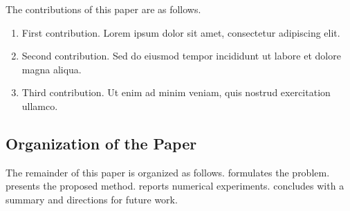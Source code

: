 The contributions of this paper are as follows.
\begin{enumerate}[label=(\arabic*)]
    \item First contribution. Lorem ipsum dolor sit amet, consectetur adipiscing elit.
    \item Second contribution. Sed do eiusmod tempor incididunt ut labore et dolore magna aliqua.
    \item Third contribution. Ut enim ad minim veniam, quis nostrud exercitation ullamco.
\end{enumerate}

\subsection{Organization of the Paper}\label{ssec:organization}

The remainder of this paper is organized as follows.
 formulates the problem.
 presents the proposed method.
 reports numerical experiments.
 concludes with a summary and directions for future work.
